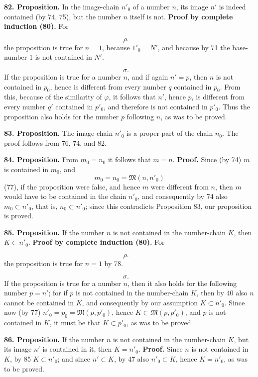 \documentclass[11pt]{article}
\newcommand{\Mf}{\mathfrak{M}}
\newcommand{\partof}{\mathrel{\subset}}
\begin{document}
\noindent\textbf{82. Proposition.} In the image-chain $n'_0$ of a number $n$, its image $n'$ is indeed contained (by 74, 75), but the number $n$ itself is not. \textbf{Proof by complete induction (80).} For

\[
\rho.\quad
\]
the proposition is true for $n=1$, because $1'_0=N'$, and because by 71 the base-number $1$ is not contained in $N'$.

\[
\sigma.\quad
\]
If the proposition is true for a number $n$, and if again $n'=p$, then $n$ is not contained in $p_0$, hence is different from every number $q$ contained in $p_0$. From this, because of the similarity of $\varphi$, it follows that $n'$, hence $p$, is different from every number $q'$ contained in $p'_0$, and therefore is not contained in $p'_0$. Thus the proposition also holds for the number $p$ following $n$, as was to be proved.

\noindent\textbf{83. Proposition.} The image-chain $n'_0$ is a proper part of the chain $n_0$. The proof follows from 76, 74, and 82.

\noindent\textbf{84. Proposition.} From $m_0=n_0$ it follows that $m=n$. \textbf{Proof.} Since (by 74) $m$ is contained in $m_0$, and
\[
m_0=n_0=\Mf(n,n'_0)
\]
(77), if the proposition were false, and hence $m$ were different from $n$, then $m$ would have to be contained in the chain $n'_0$, and consequently by 74 also $m_0\partof n'_0$, that is, $n_0\partof n'_0$; since this contradicts Proposition 83, our proposition is proved.

\noindent\textbf{85. Proposition.} If the number $n$ is not contained in the number-chain $K$, then $K\partof n'_0$. \textbf{Proof by complete induction (80).} For

\[
\rho.\quad
\]
the proposition is true for $n=1$ by 78.

\[
\sigma.\quad
\]
If the proposition is true for a number $n$, then it also holds for the following number $p=n'$; for if $p$ is not contained in the number-chain $K$, then by 40 also $n$ cannot be contained in $K$, and consequently by our assumption $K\partof n'_0$. Since now (by 77) $n'_0=p_0=\Mf(p,p'_0)$, hence $K\partof\Mf(p,p'_0)$, and $p$ is not contained in $K$, it must be that $K\partof p'_0$, as was to be proved.

\noindent\textbf{86. Proposition.} If the number $n$ is not contained in the number-chain $K$, but its image $n'$ is contained in it, then $K=n'_0$. \textbf{Proof.} Since $n$ is not contained in $K$, by 85 $K\partof n'_0$; and since $n'\partof K$, by 47 also $n'_0\partof K$, hence $K=n'_0$, as was to be proved.
\end{document}
